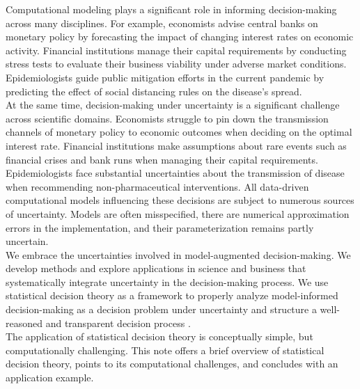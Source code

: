 
\vspace{-1.0cm} Computational modeling plays a significant role in informing decision-making across many disciplines. For example, economists advise central banks on monetary policy by forecasting the impact of changing interest rates on economic activity. Financial institutions manage their capital requirements by conducting stress tests to evaluate their business viability under adverse market conditions. Epidemiologists guide public mitigation efforts in the current pandemic by
predicting the effect of social distancing rules on the disease's spread.\\

At the same time, decision-making under uncertainty is a significant challenge across scientific domains. Economists struggle to pin down the transmission channels of monetary policy to economic outcomes when deciding on the optimal interest rate. Financial institutions make assumptions about rare events such as financial crises and bank runs when managing their capital requirements. Epidemiologists face substantial uncertainties about the transmission of disease when recommending non-pharmaceutical interventions. All data-driven computational models influencing these decisions are subject to numerous sources of uncertainty. Models are often misspecified, there are numerical approximation errors in the implementation, and their parameterization remains partly uncertain.\\

We embrace the uncertainties involved in model-augmented decision-making. We develop methods and explore applications in science and business that systematically integrate uncertainty in the decision-making process. We use statistical decision theory as a framework to properly analyze model-informed decision-making as a decision problem under uncertainty and structure a well-reasoned and transparent decision process \citep{Blesch.2021, Eisenhauer.2021, Manski.2021}.\\

The application of statistical decision theory is conceptually simple, but computationally challenging. This note offers a brief overview of statistical decision theory, points to its computational challenges, and concludes with an application example.\newpage
